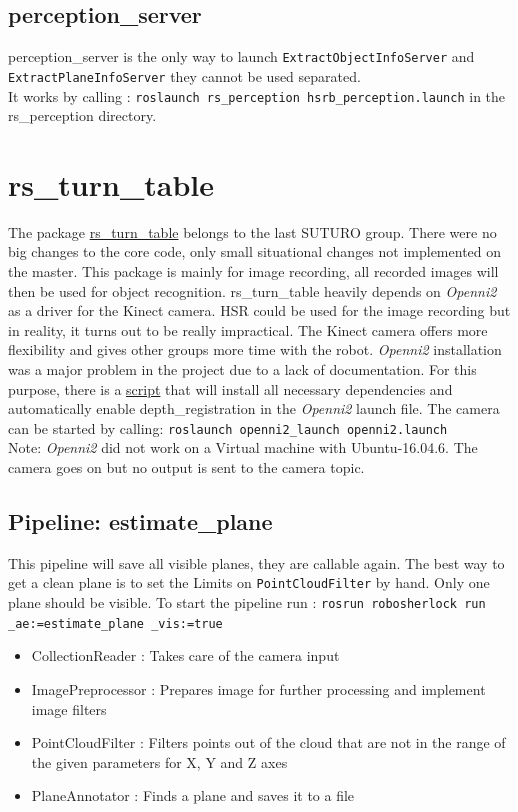 \documentclass[main.tex]{subfiles}
\begin{document}
            \subsection{perception\_server}
perception\_server is the only way to launch \texttt{ExtractObjectInfoServer} and \texttt{ExtractPlaneInfoServer} they cannot be used separated. \\
It works by calling : \texttt{roslaunch rs\_perception hsrb\_perception.launch} in the rs\_perception directory.

        \section{rs\_turn\_table}
The package \href{https://github.com/Vanessa-rin/rs_turn_table}{rs\_turn\_table} belongs to the last SUTURO group. There were no big changes to the core code, only small situational changes not implemented on the master. 
This package is mainly for image recording, all recorded images will then be used for object recognition.  
rs\_turn\_table heavily depends on \textit{Openni2} as a driver for the Kinect camera. HSR could be used for the image recording but in reality, it turns out to be really impractical. 
The Kinect camera offers more flexibility and gives other groups more time with the robot. \textit{Openni2} installation was a major problem in the project due to a lack of documentation. For this purpose, there is a 
\href{https://github.com/SUTURO/suturo_perception/blob/Openni2/Openni2/Openni2_Install}{script} that will install all necessary dependencies and automatically enable depth\_registration in the \textit{Openni2} launch file. The camera can be started by calling: \texttt{roslaunch openni2\_launch openni2.launch}
 \\ Note: \textit{Openni2} did not work on a Virtual machine with Ubuntu-16.04.6. The camera goes on but no output is sent to the camera topic. 

            \subsection{Pipeline: estimate\_plane}
This pipeline will save all visible planes, they are callable again. The best way to get a clean plane is to set the Limits on \texttt{PointCloudFilter} by hand. Only one plane should be visible. To start the pipeline run : \texttt{rosrun robosherlock run \_ae:=estimate\_plane \_vis:=true} 
\begin{itemize}
    \item CollectionReader : Takes care of the camera input
    \item ImagePreprocessor : Prepares image for further processing and implement image filters  
    \item PointCloudFilter : Filters points out of the cloud that are not in the range of the given parameters for X, Y and Z axes
    \item PlaneAnnotator : Finds a plane and saves it to a file 
\end{itemize}
\end{document}
